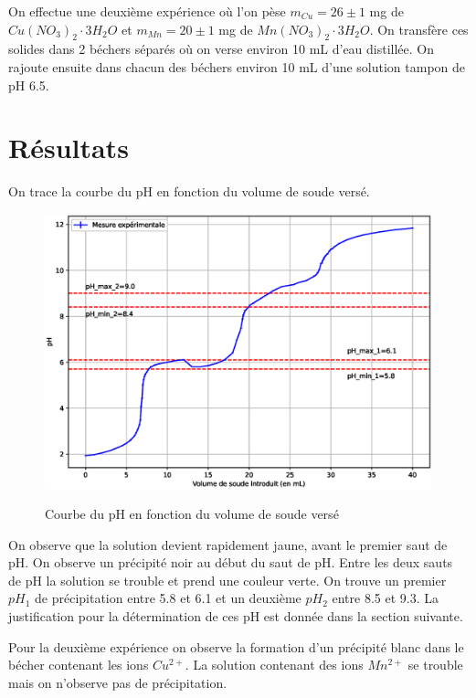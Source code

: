 \documentclass[12pt]{article}
\begin{document}
On effectue une deuxième expérience où l'on pèse $m_{Cu} = 26 \pm 1$ mg de $Cu(NO_3)_2 \cdot 3 H_2O$ et $m_{Mn}= 20 \pm 1$ mg de $Mn(NO_3)_2\cdot 3 H_2O$. On transfère ces solides dans 2 béchers séparés où on verse environ 10 mL d'eau distillée. On rajoute ensuite dans chacun des béchers environ 10 mL d'une solution tampon de pH 6.5. 


\section{Résultats}
On trace la courbe du pH en fonction du volume de soude versé.
\begin{figure}[p]
	\begin{center}
		\includegraphics[angle=-90,scale=0.9]{Courbe_dosage.eps}
		\label{img:Courbe dosage}
		\caption{Courbe du pH en fonction du volume de soude versé}
	\end{center}
\end{figure}



On observe que la solution devient rapidement jaune, avant le premier saut de pH. On observe un précipité noir au début du saut de pH. Entre les deux sauts de pH la solution se trouble et prend une couleur verte.
On trouve un premier $pH_1$ de précipitation entre 5.8 et 6.1 et un deuxième $pH_2$ entre 8.5 et 9.3. La justification pour la détermination de ces pH est donnée dans la section suivante.

Pour la deuxième expérience on observe la formation d'un précipité blanc dans le bécher contenant les ions $Cu^{2+}$. La solution contenant des ions $Mn^{2+}$ se trouble mais on n'observe pas de précipitation. 
\end{document}
